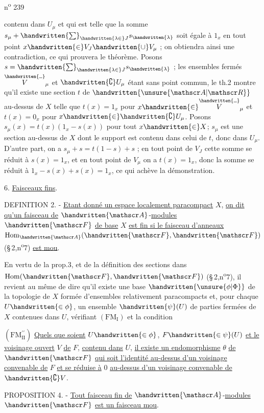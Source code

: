 n\textsuperscript{o} 239

contenu dans $U_\mu$ et qui est telle que la somme $s_\mu+\handwritten{\sum}_{\handwritten{\lambda\in}J}s_{\handwritten{\lambda}}$ soit égale à $1_x$ en tout point $x\handwritten{\in} V_J\handwritten{\cup} V_\mu$ ; on obtiendra ainsi une contradiction, ce qui prouvera le théorème. Posons $s=\handwritten{\sum}_{\handwritten{\lambda\in}J}s_{\handwritten{\lambda}}$ ; les ensembles fermés $\overset{\handwritten{\rule{.45em}{.1ex}}}{V}_\mu$ et $\handwritten{\complement}U_\mu$ étant sans point commun, le th.2 montre qu'il existe une section $t$ de $\handwritten{\unsure{\mathscr A|\mathscr R}}$ au-dessus de $X$ telle que $t(x)=1_x$ pour $x\handwritten{\in}\overset{\handwritten{\rule{.45em}{.1ex}}}{V}_\mu$ et $t(x)=0_x$ pour $x\handwritten{\in}\handwritten{\complement}U_\mu$. Posons $s_\mu(x)=t(x)(1_x-s(x))$ pour tout $x\handwritten{\in} X$; $s_\mu$ est une section au-dessus de $X$ dont le support est contenu dans celui de $t$, donc dans $U_\mu$. D'autre part, on a $s_\mu+s=t(1-s)+s$ ; en tout point de $V_J$ cette somme se réduit à $s(x)=1_x$, et en tout point de $V_\mu$ on a $t(x)=1_x$, donc la somme se réduit à $1_x-s(x)+s(x)=1_x$, ce qui achève la démonstration.

6. \uline{Faisceaux fins}.

DEFINITION 2. - \uline{Etant donné un espace localement paracompact} $X$, \uline{on dit qu'un faisceau de} $\handwritten{\mathscr A}$-\uline{modules} $\handwritten{\mathscr F}$ \uline{de base} $X$ \uline{est fin si le faisceau d'anneaux} $\operatorname{Hom}_{\handwritten{\mathscr A}}(\handwritten{\mathscr F},\handwritten{\mathscr F})$ (\S\,2,n\textsuperscript{o}7) \uline{est mou}.

En vertu de la prop.3, et de la définition des sections dans $\operatorname{Hom}(\handwritten{\mathscr F},\handwritten{\mathscr F})$ (\S\,2,n\textsuperscript{o}7), il revient au même de dire qu'il existe une base $\handwritten{\unsure{\phi|\Phi}}$ de la topologie de $X$ formée d'ensembles relativement paracompacts et, pour chaque $U\handwritten{\in\phi}$, un ensemble $\handwritten{\psi}(U)$ de parties fermées de $X$ contenues dans $U$, vérifiant $(\mathrm{FM}_{\mathrm I})$ et la condition

$(\mathrm{FM}^{\prime\prime}_{\mathrm{II}})$ \uline{Quels que soient} $U\handwritten{\in\phi}$, $F\handwritten{\in\psi}(U)$ \uline{et le voisinage ouvert} $V$ \uline{de} $F$, \uline{contenu dans} $U$, \uline{il existe un endomorphisme} $\theta$ \uline{de} $\handwritten{\mathscr F}$ \uline{qui soit l'identité au-dessus d'un voisinage convenable de} $F$ \uline{et se réduise à} $0$ \uline{au-dessus d'un voisinage convenable de} $\handwritten{\complement}V$.

PROPOSITION 4. - \uline{Tout faisceau fin de} $\handwritten{\mathscr A}$-\uline{modules} $\handwritten{\mathscr F}$ \uline{est un faisceau mou}.

